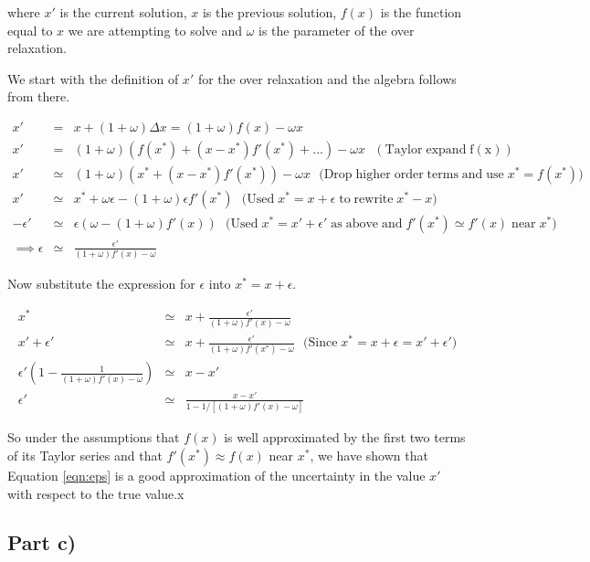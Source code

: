 \documentclass[a4paper,12pt]{article}
\begin{document}
where $x'$ is the current solution, $x$ is the previous solution, $f(x)$ is the function equal to $x$ we are attempting to solve and $\omega$ is the parameter of the over relaxation.

We start with the definition of $x'$ for the over relaxation and the algebra follows from there.

\begin{eqnarray}
x' &=& x + (1+\omega)\Delta x = (1+\omega)f(x) - \omega x\nonumber\\
x' &=& (1+\omega)(f(x^*) + (x-x^*)f'(x^*) + ...) - \omega x \mathrm{\:\:\:(Taylor\;expand\;f(x))}\nonumber\\
x' &\simeq & (1+\omega)(x^* + (x-x^*)f'(x^*)) - \omega x \mathrm{\:\:\:(Drop\; higher\;order\;terms\;and\;use\;}x^* = f(x^*)\mathrm{)}\nonumber\\
x' &\simeq & x^* + \omega \epsilon - (1+\omega)\epsilon f'(x^*) \mathrm{\:\:\:(Used\;} x^* = x + \epsilon\mathrm{\;to\; rewrite\;} x^*-x)\nonumber\\
-\epsilon' &\simeq& \epsilon (\omega - (1+\omega)f'(x))\mathrm{\:\:\:(Used\;} x^* = x' + \epsilon' \mathrm{\; as\; above\; and\;} f'(x^*)\simeq f'(x)\mathrm{\; near\;} x^*)\nonumber\\
\implies \epsilon &\simeq& \frac{\epsilon'}{(1+\omega)f'(x) - \omega}\nonumber
\end{eqnarray}

Now substitute the expression for $\epsilon$ into $x^* = x + \epsilon$.

\begin{eqnarray}
x^* &\simeq& x + \frac{\epsilon'}{(1+\omega)f'(x) - \omega}\nonumber\\
x' + \epsilon' &\simeq& x + \frac{\epsilon'}{(1+\omega)f'(x^*)-\omega} \mathrm{\:\:\:(Since\;} x^* = x + \epsilon = x' + \epsilon')\nonumber\\
\epsilon'\left(1 - \frac{1}{(1+\omega)f'(x) - \omega}\right) &\simeq& x - x'\nonumber\\
\epsilon' &\simeq& \frac{x-x'}{1-1/[(1+\omega)f'(x) - \omega]}\nonumber 
\end{eqnarray}

So under the assumptions that $f(x)$ is well approximated by the first two terms of its Taylor series and that $f'(x^*)\approx f(x)$ near $x^*$, we have shown that Equation \ref{eqn:eps} is a good approximation of the uncertainty in the value $x'$ with respect to the true value.x

\subsection{Part c)}
\end{document}
